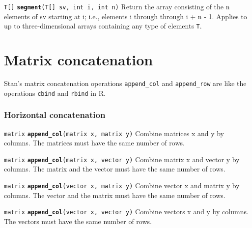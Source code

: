 \documentclass[
  10pt,
]{book}
\begin{document}

\texttt{T{[}{]}} \textbf{\texttt{segment}}\texttt{(T{[}{]}\ sv,\ int\ i,\ int\ n)}\newline
Return the array consisting of the n elements of sv starting at i;
i.e., elements i through through i + n - 1. Applies to up to
three-dimensional arrays containing any type of elements \texttt{T}.

\hypertarget{matrix-concatenation}{%
\section{Matrix concatenation}\label{matrix-concatenation}}

Stan's matrix concatenation operations \texttt{append\_col} and \texttt{append\_row}
are like the operations \texttt{cbind} and \texttt{rbind} in R.

\hypertarget{horizontal-concatenation}{%
\subsubsection{Horizontal concatenation}\label{horizontal-concatenation}}


\texttt{matrix} \textbf{\texttt{append\_col}}\texttt{(matrix\ x,\ matrix\ y)}\newline
Combine matrices x and y by columns. The matrices must have the same
number of rows.


\texttt{matrix} \textbf{\texttt{append\_col}}\texttt{(matrix\ x,\ vector\ y)}\newline
Combine matrix x and vector y by columns. The matrix and the vector
must have the same number of rows.


\texttt{matrix} \textbf{\texttt{append\_col}}\texttt{(vector\ x,\ matrix\ y)}\newline
Combine vector x and matrix y by columns. The vector and the matrix
must have the same number of rows.


\texttt{matrix} \textbf{\texttt{append\_col}}\texttt{(vector\ x,\ vector\ y)}\newline
Combine vectors x and y by columns. The vectors must have the same
number of rows.
\end{document}
